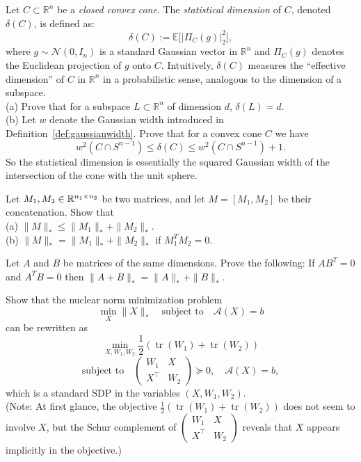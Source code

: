 \begin{myexercise}
Let $C \subset \mathbb{R}^n$ be a {\em closed convex cone}. The {\em statistical dimension} of $C$, denoted $\delta(C)$, is defined as:
$$
\delta(C) := \mathbb{E}\big[ |\Pi_C(g)|_2^2 \big],
$$
where $g \sim \mathcal{N}(0, I_n)$ is a standard Gaussian vector in $\mathbb{R}^n$ and $\Pi_C(g)$ denotes the Euclidean projection of $g$ onto $C$. Intuitively,
$\delta(C)$ measures the ``effective dimension'' of $C$ in $\mathbb{R}^n$ in a probabilistic sense, analogous to the dimension of a subspace. \\
(a) Prove that for a subspace $L \subset \mathbb{R}^n$ of dimension $d$, $\delta(L) = d$.
\\
(b) Let $w$ denote the Gaussian width introduced in Definition~\ref{def:gaussianwidth}. Prove that for a convex cone $C$ we have
$$
w^2(C \cap S^{n-1}) \le \delta(C) \le w^2(C \cap S^{n-1}) + 1.
$$
So the statistical dimension is essentially the squared Gaussian width of the intersection of the cone with the unit sphere.
\end{myexercise}

\begin{myexercise}
Let $M_1, M_2 \in \mathbb{R}^{n_1\times n_2}$ be two matrices, and
let $M=[M_1, M_2]$ be their concatenation. Show that \\
(a) $\|M\|_* \le \|M_1\|_* + \|M_2\|_*$. \\
(b) $\|M\|_* = \|M_1\|_* + \|M_2\|_*$ if $M_1^{T} M_2 = 0$.
\end{myexercise}

\begin{myexercise}
Let $A$ and $B$ be matrices of the same dimensions. Prove the following:
If $A B^T = 0$ and $A^T B = 0$ then 
$\|A+B\|_* = \|A\|_* +\|B\|_*$.
\end{myexercise}

\begin{myexercise}\label{ex:nuclear_SDP}
Show that the nuclear norm minimization problem
$$\min_X \|X\|_* \quad \text{subject to} \quad \mathcal{A}(X) = b$$
can be rewritten  as
$$\min_{X, W_1, W_2} \frac{1}{2}\left(\operatorname{tr}(W_1) + \operatorname{tr}(W_2)\right)$$
$$\text{subject to} \quad \begin{pmatrix} W_1 & X \\ X^\top & W_2 \end{pmatrix} \succeq 0, \quad \mathcal{A}(X) = b,$$
which is a standard SDP in the variables $(X, W_1, W_2)$. \\ (Note: At first glance, the objective $\frac{1}{2}\left(\operatorname{tr}(W_1) + \operatorname{tr}(W_2)\right)$ does not seem to involve $X$, but  the Schur complement of $\begin{pmatrix} W_1 & X \\ X^\top & W_2 \end{pmatrix}$
reveals that $X$ appears implicitly in the objective.)
\end{myexercise}



